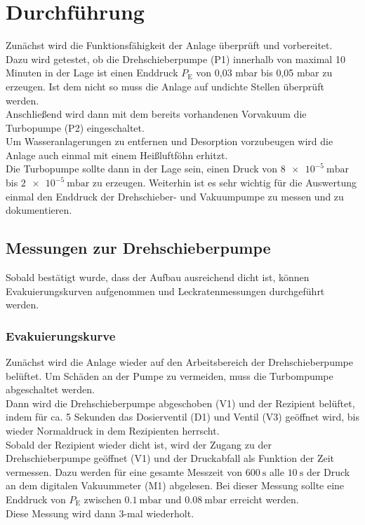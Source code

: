 \section{Durchführung}
	Zunächst wird die Funktionsfähigkeit der Anlage überprüft und vorbereitet. \\
	Dazu wird getestet, ob die Drehschieberpumpe (P1) innerhalb von maximal 10 Minuten in der Lage ist einen Enddruck $P_\text{E}$ von 0,03 mbar bis 0,05 mbar zu erzeugen. 
	Ist dem nicht so muss die Anlage auf undichte Stellen überprüft werden. \\
	Anschließend wird dann mit dem bereits vorhandenen Vorvakuum die Turbopumpe (P2) eingeschaltet.\\
	Um Wasseranlagerungen zu entfernen und Desorption vorzubeugen wird die Anlage auch einmal mit einem Heißluftföhn erhitzt.\\
	Die Turbopumpe sollte dann in der Lage sein, einen Druck von $\SI{8 e-5}{\milli\bar}$ bis $\SI{2 e-5}{\milli\bar}$ zu erzeugen.
	Weiterhin ist es sehr wichtig für die Auswertung einmal den Enddruck der Drehschieber- und Vakuumpumpe zu messen und zu dokumentieren.	


	\subsection{Messungen zur Drehschieberpumpe}

		Sobald bestätigt wurde, dass der Aufbau ausreichend dicht ist, können Evakuierungskurven aufgenommen und Leckratenmessungen durchgeführt werden.

		\subsubsection{Evakuierungskurve}

			Zunächst wird die Anlage wieder auf den Arbeitsbereich der Drehschieberpumpe belüftet. 
			Um Schäden an der Pumpe zu vermeiden, muss die Turbompumpe abgeschaltet werden. \\
			Dann wird die Drehschieberpumpe abgeschoben (V1) und der Rezipient belüftet, 
			indem für ca. 5 Sekunden das Dosierventil (D1) und Ventil (V3) geöffnet wird, 
			bis wieder Normaldruck in dem Rezipienten herrscht. \\
			Sobald der Rezipient wieder dicht ist, wird der Zugang zu der Drehschieberpumpe geöffnet (V1) und der Druckabfall als Funktion der Zeit vermessen. 
			Dazu werden für eine gesamte Messzeit von $\SI{600}{\second}$ alle $\SI{10}{\second}$ der Druck an dem digitalen Vakuummeter (M1) abgelesen.
			Bei dieser Messung sollte eine Enddruck von $P_\text{E}$ zwischen $\SI{0.1}{\milli\bar}$ und $\SI{0.08}{\milli\bar}$ erreicht werden.\\
			Diese Messung wird dann 3-mal wiederholt.

